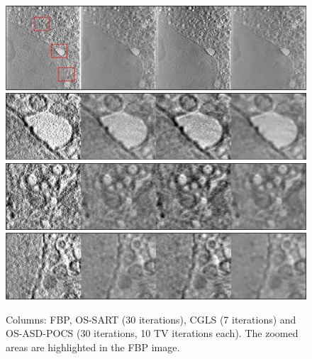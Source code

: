 \begin{figure}
\begin{center}

\includegraphics[width=\textwidth]{Applications/Diamond5.png} 
\includegraphics[width=\textwidth]{Applications/Diamond5zoom1.png} 
\includegraphics[width=\textwidth]{Applications/Diamond5zoom2.png} 
\includegraphics[width=\textwidth]{Applications/Diamond5zoom3.png} 

\end{center}

\caption[Cell image recosntructed with different algorithms 3]{\label{fig:Diamond3} Columns: FBP, OS-SART (30 iterations), CGLS (7 iterations) and OS-ASD-POCS (30 iterations, 10 TV iterations each). The zoomed areas are highlighted in the FBP image.} 
\end{figure}
